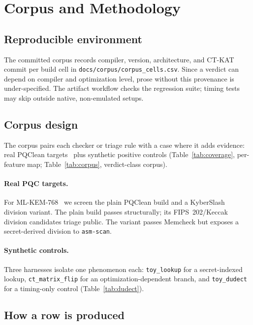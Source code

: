 \section{Corpus and Methodology}
\label{sec:method}

\subsection{Reproducible environment}

The committed corpus records compiler, version, architecture, and CT-KAT commit
per build cell in \texttt{docs/corpus/corpus\_cells.csv}. Since a verdict can
depend on compiler and optimization level, prose without this provenance is
under-specified. The artifact workflow checks the regression suite; timing tests
may skip outside native, non-emulated setups.

\subsection{Corpus design}

The corpus pairs each checker or triage rule with a case where it adds evidence:
real PQClean targets~\cite{pqclean} plus synthetic positive controls
(Table~\ref{tab:coverage}, per-feature map;
Table~\ref{tab:corpus}, verdict-class corpus).

\paragraph{Real PQC targets.}
For ML-KEM-768~\cite{fips203} we screen the plain PQClean build and a
KyberSlash~\cite{kyberslash} division variant. The plain build passes
structurally; its FIPS~202/Keccak division candidates triage public. The variant
passes Memcheck but exposes a secret-derived division to \texttt{asm-scan}.

\paragraph{Synthetic controls.}
Three harnesses isolate one phenomenon each: \texttt{toy\_lookup} for a
secret-indexed lookup, \texttt{ct\_matrix\_flip} for an optimization-dependent
branch, and \texttt{toy\_dudect} for a timing-only control (Table~\ref{tab:dudect}).

\subsection{How a row is produced}

